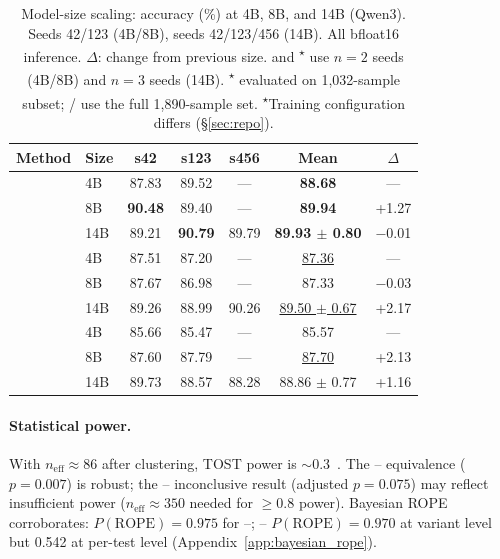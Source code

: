 \begin{table}[t]
\centering
\small
\caption{Model-size scaling: accuracy (\%) at 4B, 8B, and 14B (Qwen3). Seeds 42/123 (4B/8B), seeds 42/123/456 (14B). All bfloat16 inference. $\Delta$: change from previous size. \cwm{} and \traj{}\textsuperscript{$\star$} use $n{=}2$ seeds (4B/8B) and $n{=}3$ seeds (14B). \traj{}\textsuperscript{$\star$} evaluated on 1{,}032-sample subset; \cls{}/\cwm{} use the full 1{,}890-sample set. \textsuperscript{$\star$}Training configuration differs (\S\ref{sec:repo}).}
\label{tab:scaling}
\setlength{\tabcolsep}{3pt}
\renewcommand{\arraystretch}{0.92}
\begin{tabular}{llccccc}
\toprule
\textbf{Method} & \textbf{Size} & \textbf{s42} & \textbf{s123} & \textbf{s456} & \textbf{Mean} & \textbf{$\Delta$} \\
\midrule
\multirow{3}{*}{\cls{}} & 4B & 87.83 & 89.52 & --- & \textbf{88.68} & --- \\
 & 8B & \textbf{90.48} & 89.40 & --- & \textbf{89.94} & +1.27 \\
 & 14B & 89.21 & \textbf{90.79} & 89.79 & \textbf{89.93 $\pm$ 0.80} & $-$0.01 \\
\midrule
\multirow{3}{*}{\cwm{}} & 4B & 87.51 & 87.20 & --- & \underline{87.36} & --- \\
 & 8B & 87.67 & 86.98 & --- & 87.33 & $-$0.03 \\
 & 14B & 89.26 & 88.99 & 90.26 & \underline{89.50 $\pm$ 0.67} & +2.17 \\
\midrule
\multirow{3}{*}{\traj{}} & 4B & 85.66 & 85.47 & --- & 85.57 & --- \\
 & 8B & 87.60 & 87.79 & --- & \underline{87.70} & +2.13 \\
 & 14B & 89.73 & 88.57 & 88.28 & 88.86 $\pm$ 0.77 & +1.16 \\
\bottomrule
\end{tabular}
\end{table}

\paragraph{Statistical power.} With $n_{\text{eff}} \approx 86$ after clustering, TOST power is ${\sim}$0.3~\cite{cohen1988}. The \cls{}--\cwm{} equivalence ($p{=}0.007$) is robust; the \cls{}--\traj{} inconclusive result (adjusted $p{=}0.075$) may reflect insufficient power ($n_{\text{eff}} \approx 350$ needed for ${\geq}$0.8 power). Bayesian ROPE corroborates: $P(\text{ROPE}){=}0.975$ for \cls{}--\cwm{}; \cls{}--\traj{} $P(\text{ROPE}){=}0.970$ at variant level but 0.542 at per-test level (Appendix~\ref{app:bayesian_rope}).


